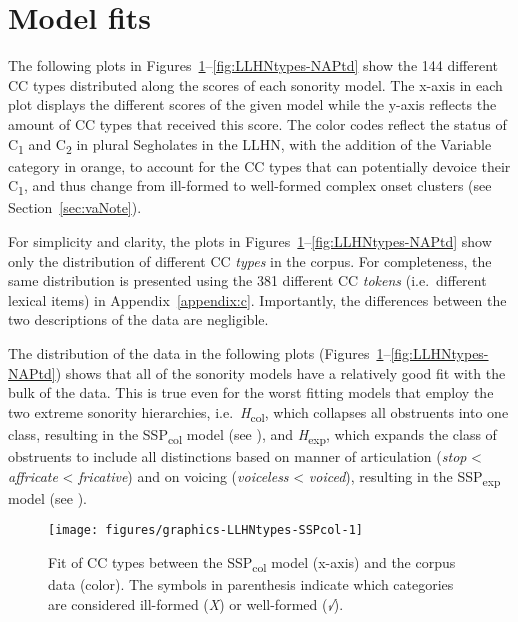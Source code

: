 \section{Model fits}\label{sec:mFits}

The following plots in Figures~\ref{fig:LLHNtypes-SSPcol}--\ref{fig:LLHNtypes-NAPtd} show the 144 different CC types %
distributed along the scores of each sonority model. The x-axis in each plot displays the different scores of the given model while the y-axis reflects the amount of CC types that received this score. The color codes reflect the status of C\textsubscript{1} and C\textsubscript{2} in plural Segholates in the LLHN, with the addition of the Variable category in orange, to account for the CC types that can potentially devoice their C\textsubscript{1}, and thus change from ill-formed to well-formed complex onset clusters (see Section~\ref{sec:vaNote}).

For simplicity and clarity, the plots in Figures~\ref{fig:LLHNtypes-SSPcol}--\ref{fig:LLHNtypes-NAPtd} show only the distribution of different CC \emph{types} in the corpus. For completeness, the same distribution is presented using the 381 different CC \emph{tokens} (i.e.~different lexical items) in Appendix~\ref{appendix:c}.
Importantly, the differences between the two descriptions of the data are negligible.

The distribution of the data in the following plots (Figures~\ref{fig:LLHNtypes-SSPcol}--\ref{fig:LLHNtypes-NAPtd}) shows that all of the sonority models have a relatively good fit with the bulk of the data. This is true even for the worst fitting models that employ the two extreme sonority hierarchies, i.e.~\emph{H}\textsubscript{col}, which collapses all obstruents into one class, resulting in the SSP\textsubscript{col} model (see ), and \emph{H}\textsubscript{exp}, which expands the class of obstruents to include all distinctions based on manner of articulation (\emph{stop} \textless{} \emph{affricate} \textless{} \emph{fricative}) and on voicing (\emph{voiceless} \textless{} \emph{voiced}), resulting in the SSP\textsubscript{exp} model (see ).



\begin{figure}
\centering \texttt{[image: figures/graphics-LLHNtypes-SSPcol-1]} 
\caption{Fit of CC types between the SSP\textsubscript{col} model (x-axis) and the corpus data (color). The symbols in parenthesis indicate which categories are considered 
ill-formed (\emph{X}) or well-formed (\emph{√}).}\label{fig:LLHNtypes-SSPcol}
\end{figure}

